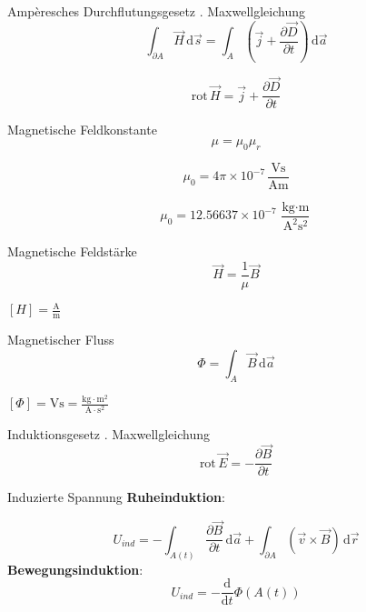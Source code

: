 \documentclass[a7paper]{kartei}
\begin{document}
\begin{karte}[Magnetostatik]{Ampèresches Durchflutungsgesetz}
. Maxwellgleichung
\\
\[
\int_{\partial A} \vec{H} \, \mathrm{d}\vec{s} = \int_A \left(\vec{j} + \frac{\partial \vec{D}}{\partial t}\right) \, \mathrm{d}\vec{a}
\]

\[
\text{rot} \, \vec{H} = \vec{j} + \frac{\partial \vec{D}}{\partial t}
\]

\end{karte}

\begin{karte}[Magnetostatik]{Magnetische Feldkonstante}
\[
\mu = \mu_0 \mu_r
\]

\[
\mu_0 = 4\pi \times 10^{-7} \, \frac{\text{Vs}}{\text{Am}}
\]

\[
\mu_0 = 12.56637 \times 10^{-7} \, \frac{\text{kg} \cdot \text{m}}{\text{A}^2 \text{s}^2}
\]
\end{karte}

\begin{karte}[Magnetostatik]{Magnetische Feldstärke}
\[
\vec{H} = \frac{1}{\mu} \vec{B}
\]

\([H] = \frac{\text{A}}{\text{m}}\)
\end{karte}

\begin{karte}[Magnetostatik]{Magnetischer Fluss}
\[
\Phi = \int_A \vec{B} \, \mathrm{d}\vec{a}
\]

\([\Phi] = \text{Vs} = \frac{\text{kg} \cdot \text{m}^2}{\text{A} \cdot \text{s}^2}\)
\end{karte}

\begin{karte}[Magnetostatik]{Induktionsgesetz}
. Maxwellgleichung
\\
\[
\text{rot} \, \vec{E} = -\frac{\partial \vec{B}}{\partial t}
\]
\end{karte}

\begin{karte}[Magnetostatik]{Induzierte Spannung}
\textbf{Ruheinduktion}:

\[
U_{ind} = -\int_{A(t)} \frac{\partial \vec{B}}{\partial t} \, \mathrm{d}\vec{a} + \int_{\partial A} (\vec{v} \times \vec{B}) \, \mathrm{d}\vec{r}
\]
\textbf{Bewegungsinduktion}:
\[
U_{ind} = -\frac{\mathrm{d}}{\mathrm{d}t} \Phi(A(t))
\]
\end{karte}
\end{document}

